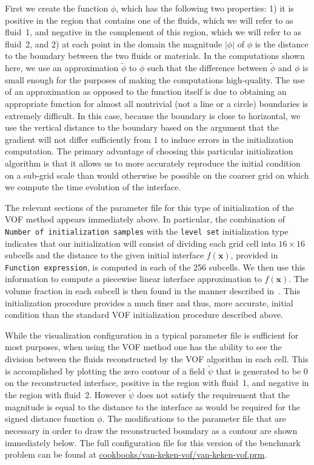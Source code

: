 First we create the function $\phi$, which has the following two properties: 1) it is positive 
in the region that contains one of the fluids, which we will refer to as fluid~1, and negative 
in the complement of this region, which we will refer to as fluid~2, and 2) at each point in 
the domain the magnitude $| \phi |$ of $\phi$ is the distance to the boundary between the 
two fluids or materials.
In the computations shown here, we use an approximation $\tilde{\phi}$ to $\phi$ such that the
difference between $\tilde{\phi}$ and $\phi$ is small enough for the purposes of making the 
computations high-quality.
The use of an approximation as opposed to the function itself is due to obtaining an appropriate function for almost all nontrivial (not a line or a circle) boundaries is extremely difficult.
In this case, because the boundary is close to horizontal, we use the vertical distance to the boundary based on the argument that the gradient will not differ sufficiently from $1$ to induce errors in the initialization computation.
The primary advantage of choosing this particular initialization algorithm is that it allows us 
to more accurately reproduce the initial condition on a sub-grid scale than would otherwise be 
possible on the coarser grid on which we compute the time evolution of the interface. 




The relevant sections of the parameter file for this type of initialization of the VOF method 
appears immediately above.
In particular, the combination of \texttt{Number of initialization samples} with the 
\texttt{level set} initialization type indicates that our initialization will consist of 
dividing each grid cell into $16 \times 16$ subcells and the distance to the given initial 
interface $f(\mathbf x)$, provided in \texttt{Function expression}, is computed in each of the 256 
subcells.
We then use this information to compute a piecewise linear interface approximation to $f(\mathbf x)$.
The volume fraction in each subcell is then found in the manner described 
in~\cite{JMR:2019,JMR-EGP:2019}.
This initialization procedure provides a much finer and thus, more accurate, initial condition 
than the standard VOF initialization procedure described above.

While the visualization configuration in a typical parameter file is sufficient for most 
purposes, when using the VOF method one has the ability to see the division between the fluids 
reconstructed by the VOF algorithm in each cell.
This is accomplished by plotting the zero contour of a field $\tilde\psi$ that
is generated to be $0$ on the reconstructed interface, positive in the region
with fluid~1, and negative in the region with fluid~2.
However $\tilde{\psi}$ does not satisfy the requirement that the magnitude is
equal to the distance to the interface as would be required for the signed
distance function $\phi$.
The modifications to the parameter file that are necessary in order to draw the reconstructed 
boundary as a contour are shown immediately below.
The full configuration file for this version of the benchmark problem can be found at 
\url{cookbooks/van-keken-vof/van-keken-vof.prm}.

